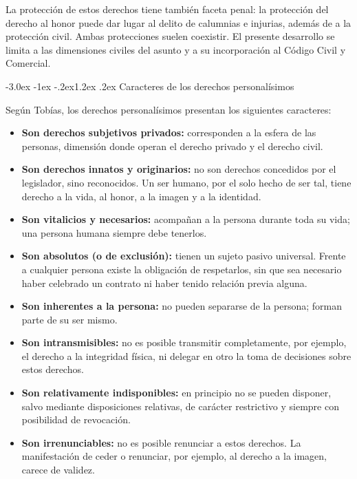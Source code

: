 \documentclass[12pt,oneside]{book}
\makeatletter
\renewcommand\section{\@startsection{section}{1}{\z@}%
  {-3.0ex \@plus -1ex \@minus -.2ex}{1.2ex \@plus .2ex}%
  {\normalfont\large\bfseries\color{acento}}}
\makeatother
\begin{document}
\begin{nota}
La protección de estos derechos tiene también faceta penal: la protección del derecho al honor puede dar lugar al delito de calumnias e injurias, además de a la protección civil. Ambas protecciones suelen coexistir. El presente desarrollo se limita a las dimensiones civiles del asunto y a su incorporación al Código Civil y Comercial.
\end{nota}

\section{Caracteres de los derechos personalísimos}

Según Tobías, los derechos personalísimos presentan los siguientes caracteres:

\begin{itemize}
    \item \textbf{Son derechos subjetivos privados:} corresponden a la esfera de las personas, dimensión donde operan el derecho privado y el derecho civil.
    \item \textbf{Son derechos innatos y originarios:} no son derechos concedidos por el legislador, sino reconocidos. Un ser humano, por el solo hecho de ser tal, tiene derecho a la vida, al honor, a la imagen y a la identidad.
    \item \textbf{Son vitalicios y necesarios:} acompañan a la persona durante toda su vida; una persona humana siempre debe tenerlos.
    \item \textbf{Son absolutos (o de exclusión):} tienen un sujeto pasivo universal. Frente a cualquier persona existe la obligación de respetarlos, sin que sea necesario haber celebrado un contrato ni haber tenido relación previa alguna.
    \item \textbf{Son inherentes a la persona:} no pueden separarse de la persona; forman parte de su ser mismo.
    \item \textbf{Son intransmisibles:} no es posible transmitir completamente, por ejemplo, el derecho a la integridad física, ni delegar en otro la toma de decisiones sobre estos derechos.
    \item \textbf{Son relativamente indisponibles:} en principio no se pueden disponer, salvo mediante disposiciones relativas, de carácter restrictivo y siempre con posibilidad de revocación.
    \item \textbf{Son irrenunciables:} no es posible renunciar a estos derechos. La manifestación de ceder o renunciar, por ejemplo, al derecho a la imagen, carece de validez.
\end{itemize}
\end{document}

